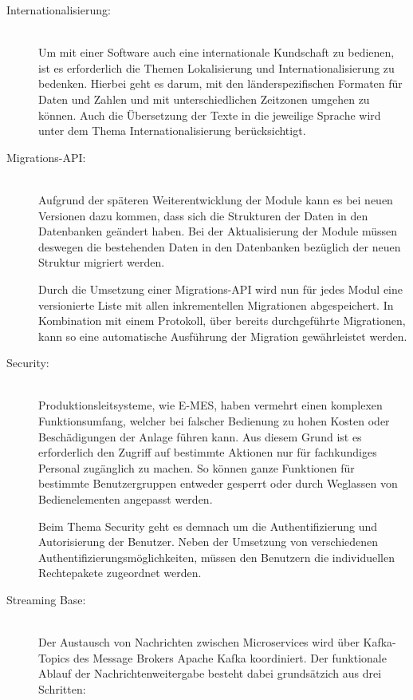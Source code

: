 \begin{description}
    \item[Internationalisierung:]\hfill \\
    Um mit einer Software auch eine internationale Kundschaft zu bedienen, ist es erforderlich die Themen Lokalisierung und Internationalisierung zu bedenken. Hierbei geht es darum, mit den länderspezifischen Formaten für Daten und Zahlen und mit unterschiedlichen Zeitzonen umgehen zu können. Auch die Übersetzung der Texte in die jeweilige Sprache wird unter dem Thema Internationalisierung berücksichtigt.
    
    \item[Migrations-API:]\hfill \\
    Aufgrund der späteren Weiterentwicklung der Module kann es bei neuen Versionen dazu kommen, dass sich die Strukturen der Daten in den Datenbanken geändert haben. Bei der Aktualisierung der Module müssen deswegen die bestehenden Daten in den Datenbanken bezüglich der neuen Struktur migriert werden.

    Durch die Umsetzung einer Migrations-API wird nun für jedes Modul eine versionierte Liste mit allen inkrementellen Migrationen abgespeichert. In Kombination mit einem Protokoll, über bereits durchgeführte Migrationen, kann so eine automatische Ausführung der Migration gewährleistet werden.

    \item[Security:]\hfill \\
    Produktionsleitsysteme, wie \glqq E-MES\grqq{}, haben vermehrt einen komplexen Funktionsumfang, welcher bei falscher Bedienung zu hohen Kosten oder Beschädigungen der Anlage führen kann. Aus diesem Grund ist es erforderlich den Zugriff auf bestimmte Aktionen nur für fachkundiges Personal zugänglich zu machen. So können ganze Funktionen für bestimmte Benutzergruppen entweder gesperrt oder durch Weglassen von Bedienelementen angepasst werden.

    Beim Thema \glqq Security\grqq{} geht es demnach um die Authentifizierung und Autorisierung der Benutzer. Neben der Umsetzung von verschiedenen Authentifizierungsmöglichkeiten, müssen den Benutzern die individuellen Rechtepakete zugeordnet werden.

    \item[Streaming Base:]\hfill \\
    Der Austausch von Nachrichten zwischen Microservices wird über Kafka-Topics des Message Brokers \glqq Apache Kafka\grqq{} koordiniert. Der funktionale Ablauf der Nachrichtenweitergabe besteht dabei grundsätzich aus drei Schritten:


\end{description}
